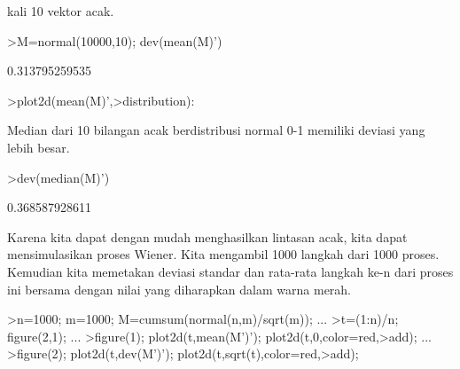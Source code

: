 \documentclass[a4paper,10pt]{article}
\begin{document}
\begin{eulernotebook}
\begin{eulercomment}
\begin{eulercomment}
\begin{eulercomment}
\begin{eulercomment}
\begin{eulercomment}
\begin{eulercomment}
\begin{eulercomment}
\begin{eulercomment}
\begin{eulercomment}
\begin{eulercomment}
\begin{eulercomment}
\begin{eulercomment}
\begin{eulercomment}
\begin{eulercomment}
\begin{eulercomment}
\begin{eulercomment}
\begin{eulercomment}
\begin{eulercomment}
\begin{eulercomment}
\begin{eulercomment}
\begin{eulercomment}
\begin{eulercomment}
\begin{eulercomment}
\begin{eulercomment}
\begin{eulercomment}
\begin{eulercomment}
\begin{eulercomment}
\begin{eulercomment}
\begin{eulercomment}
\begin{eulercomment}
\begin{eulercomment}
\begin{eulercomment}
\begin{eulercomment}
\begin{eulercomment}
\begin{eulercomment}
\begin{eulercomment}
\begin{eulercomment}
\begin{eulercomment}
\begin{eulercomment}
\begin{eulercomment}
\begin{eulercomment}
\begin{eulercomment}
\begin{eulercomment}
\begin{eulercomment}
\begin{eulercomment}
\begin{eulercomment}
\begin{eulercomment}
\begin{eulercomment}
\begin{eulercomment}
\begin{eulercomment}
\begin{eulercomment}
\begin{eulercomment}
\begin{eulercomment}
\begin{eulercomment}
\begin{eulercomment}
\begin{eulercomment}
\begin{eulercomment}
\begin{eulercomment}
\begin{eulercomment}
\begin{eulercomment}
\begin{eulercomment}
\begin{eulercomment}
\begin{eulercomment}
\begin{eulercomment}
\begin{eulercomment}
\begin{eulercomment}
\begin{eulercomment}
kali 10
vektor acak.
\end{eulercomment}
\begin{eulerprompt}
>M=normal(10000,10); dev(mean(M)')
\end{eulerprompt}
\begin{euleroutput}
  0.313795259535
\end{euleroutput}
\begin{eulerprompt}
>plot2d(mean(M)',>distribution):
\end{eulerprompt}
\begin{eulercomment}
Median dari 10 bilangan acak berdistribusi normal 0-1 memiliki deviasi
yang lebih besar.
\end{eulercomment}
\begin{eulerprompt}
>dev(median(M)')
\end{eulerprompt}
\begin{euleroutput}
  0.368587928611
\end{euleroutput}
\begin{eulercomment}
Karena kita dapat dengan mudah menghasilkan lintasan acak, kita dapat
mensimulasikan proses Wiener. Kita mengambil 1000 langkah dari 1000
proses. Kemudian kita memetakan deviasi standar dan rata-rata langkah
ke-n dari proses ini bersama dengan nilai yang diharapkan dalam warna
merah.
\end{eulercomment}
\begin{eulerprompt}
>n=1000; m=1000; M=cumsum(normal(n,m)/sqrt(m)); ...
>t=(1:n)/n; figure(2,1); ...
>figure(1); plot2d(t,mean(M')'); plot2d(t,0,color=red,>add); ...
>figure(2); plot2d(t,dev(M')'); plot2d(t,sqrt(t),color=red,>add); 
\end{eulerprompt}
\end{eulercomment}
\end{eulercomment}
\end{eulercomment}
\end{eulercomment}
\end{eulercomment}
\end{eulercomment}
\end{eulercomment}
\end{eulercomment}
\end{eulercomment}
\end{eulercomment}
\end{eulercomment}
\end{eulercomment}
\end{eulercomment}
\end{eulercomment}
\end{eulercomment}
\end{eulercomment}
\end{eulercomment}
\end{eulercomment}
\end{eulercomment}
\end{eulercomment}
\end{eulercomment}
\end{eulercomment}
\end{eulercomment}
\end{eulercomment}
\end{eulercomment}
\end{eulercomment}
\end{eulercomment}
\end{eulercomment}
\end{eulercomment}
\end{eulercomment}
\end{eulercomment}
\end{eulercomment}
\end{eulercomment}
\end{eulercomment}
\end{eulercomment}
\end{eulercomment}
\end{eulercomment}
\end{eulercomment}
\end{eulercomment}
\end{eulercomment}
\end{eulercomment}
\end{eulercomment}
\end{eulercomment}
\end{eulercomment}
\end{eulercomment}
\end{eulercomment}
\end{eulercomment}
\end{eulercomment}
\end{eulercomment}
\end{eulercomment}
\end{eulercomment}
\end{eulercomment}
\end{eulercomment}
\end{eulercomment}
\end{eulercomment}
\end{eulercomment}
\end{eulercomment}
\end{eulercomment}
\end{eulercomment}
\end{eulercomment}
\end{eulercomment}
\end{eulercomment}
\end{eulercomment}
\end{eulercomment}
\end{eulercomment}
\end{eulercomment}
\end{eulernotebook}
\end{document}
